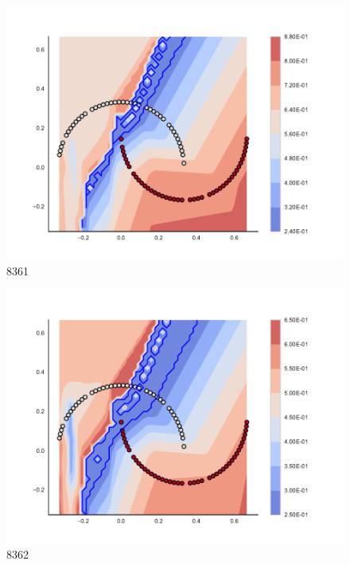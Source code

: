 \begin{subfigure}[b]{0.09\textwidth}
    \includegraphics[clip, trim=2.35cm 1.75cm 4.5cm 0cm,width=\textwidth]{img/convergence/8361.pdf}
    \caption{8361}
    \label{fig:convergence_8361}
\end{subfigure}
%
\begin{subfigure}[b]{0.09\textwidth}
    \includegraphics[clip, trim=2.35cm 1.75cm 4.5cm 0cm,width=\textwidth]{img/convergence/8362.pdf}
    \caption{8362}
    \label{fig:convergence_8362}
\end{subfigure}
%
